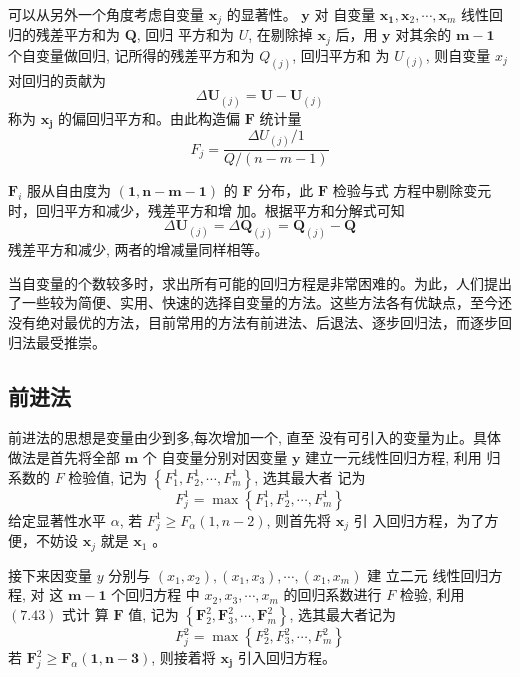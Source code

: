 可以从另外一个角度考虑自变量 \( \boldsymbol{x}_{j} \) 的显著性。 \( \boldsymbol{y} \) 对 自变量 \( \boldsymbol{x}_{\mathbf{1}}, \boldsymbol{x}_{2}, \cdots, \boldsymbol{x}_{m} \) 线性回归的残差平方和为 \( \boldsymbol{Q} \), 回归
平方和为 \( U \), 在剔除掉 \( \boldsymbol{x}_{j} \) 后，用 \( \boldsymbol{y} \) 对其余的 \( \boldsymbol{m}-\mathbf{1} \) 个自变量做回归, 记所得的残差平方和为 $ Q_{(j)} $, 回归平方和
为 \( U_{(j)} \), 则自变量 \( x_{j} \) 对回归的贡献为
$$
\Delta \boldsymbol{U}_{(j)}=\boldsymbol{U}-\boldsymbol{U}_{(j)}
$$
称为 \( \boldsymbol{x}_{\boldsymbol{j}} \) 的偏回归平方和。由此构造偏 \( \boldsymbol{F} \) 统计量
$$
F_{j}=\frac{\Delta U_{(j)} / 1}{Q /(n-m-1)}
$$

\( \boldsymbol{F}_{i} \) 服从自由度为 \( (\mathbf{1}, \boldsymbol{n}-\boldsymbol{m}-\mathbf{1}) \) 的 \( \boldsymbol{F} \) 分布，此 \( \boldsymbol{F} \) 检验与式
方程中剔除变元时，回归平方和减少，残差平方和增 加。根据平方和分解式可知
$$
\Delta \boldsymbol{U}_{(j)}=\Delta \boldsymbol{Q}_{(j)}=\boldsymbol{Q}_{(j)}-\boldsymbol{Q}
$$
残差平方和减少, 两者的增减量同样相等。

当自变量的个数较多时，求出所有可能的回归方程是非常困难的。为此，人们提出了一些较为简便、实用、快速的选择自变量的方法。这些方法各有优缺点，至今还没有绝对最优的方法，目前常用的方法有前进法、后退法、逐步回归法，而逐步回归法最受推崇。

\subsection{前进法}

前进法的思想是变量由少到多,每次增加一个, 直至
没有可引入的变量为止。具体做法是首先将全部 \( \boldsymbol{m} \) 个 自变量分别对因变量 \( \boldsymbol{y} \) 建立一元线性回归方程, 利用
归系数的 \( F \) 检验值, 记为 \( \left\{F_{1}^{1}, F_{2}^{1}, \cdots, F_{m}^{1}\right\} \), 选其最大者 记为
$$
F_{j}^{1}=\max \left\{F_{1}^{1}, F_{2}^{1}, \cdots, F_{m}^{1}\right\}
$$
给定显著性水平 \( \alpha \), 若 \( F_{j}^{1} \geq F_{\alpha}(1, n-2) \), 则首先将 \( \boldsymbol{x}_{j} \) 引 入回归方程，为了方便，不妨设 \( \boldsymbol{x}_{j} \) 就是 \( \boldsymbol{x}_{1} \) 。

接下来因变量 \( y \) 分别与 \( \left(x_{1}, x_{2}\right),\left(x_{1}, x_{3}\right), \cdots,\left(x_{1}, x_{m}\right) \) 建
立二元 线性回归方程, 对 这 \( \boldsymbol{m}-\mathbf{1} \) 个回归方程 中 \( x_{2}, x_{3}, \cdots, x_{m} \) 的回归系数进行 \( F \) 检验, 利用 \( (7.43) \) 式计 算 \( \boldsymbol{F} \) 值, 记为 \( \left\{\boldsymbol{F}_{2}^{2}, \boldsymbol{F}_{3}^{2}, \cdots, \boldsymbol{F}_{m}^{2}\right\} \), 选其最大者记为
$$
F_{j}^{2}=\max \left\{F_{2}^{2}, F_{3}^{2}, \cdots, F_{m}^{2}\right\}
$$
若 \( \boldsymbol{F}_{j}^{2} \geq \boldsymbol{F}_{\alpha} \mathbf{( 1 , n - 3 )} \), 则接着将 \( \boldsymbol{x}_{\boldsymbol{j}} \) 引入回归方程。

